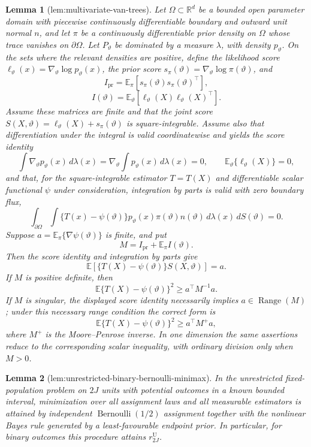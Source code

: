 \documentclass{article}
\newtheorem{lemma}{Lemma}
\begin{document}
\begin{lemma}[lem:multivariate-van-trees]\label{lem:multivariate-van-trees}
Let \(\Omega\subset\mathbb R^d\) be a bounded open parameter domain with piecewise continuously differentiable boundary and outward unit normal \(n\), and let \(\pi\) be a continuously differentiable prior density on \(\Omega\) whose trace vanishes on \(\partial\Omega\). Let \(P_\vartheta\) be dominated by a measure \(\lambda\), with density \(p_\vartheta\). On the sets where the relevant densities are positive, define the likelihood score \(\ell_\vartheta(x)=\nabla_\vartheta\log p_\vartheta(x)\), the prior score \(s_\pi(\vartheta)=\nabla_\vartheta\log\pi(\vartheta)\), and
\[
 I_{\mathrm{pr}}
 =\mathbb E_\pi\!\left[
 s_\pi(\vartheta)s_\pi(\vartheta)^{\!\top}
 \right],
\]
\[
 I(\vartheta)
 =\mathbb E_\vartheta\!\left[
 \ell_\vartheta(X)\ell_\vartheta(X)^{\!\top}
 \right].
\]
Assume these matrices are finite and that the joint score \(S(X,\vartheta)=\ell_\vartheta(X)+s_\pi(\vartheta)\) is square-integrable. Assume also that differentiation under the integral is valid coordinatewise and yields the score identity
\[
 \int \nabla_\vartheta p_\vartheta(x)\,d\lambda(x)
 =\nabla_\vartheta\int p_\vartheta(x)\,d\lambda(x)=0,
 \qquad
 \mathbb E_\vartheta\{\ell_\vartheta(X)\}=0,
\]
and that, for the square-integrable estimator \(T=T(X)\) and differentiable scalar functional \(\psi\) under consideration, integration by parts is valid with zero boundary flux,
\[
 \int_{\partial\Omega}\int
 \{T(x)-\psi(\vartheta)\}p_\vartheta(x)\pi(\vartheta)
 n(\vartheta)\,d\lambda(x)\,dS(\vartheta)=0.
\]
Suppose \(a=\mathbb E_\pi\{\nabla\psi(\vartheta)\}\) is finite, and put
\[
 M=I_{\mathrm{pr}}+\mathbb E_\pi I(\vartheta).
\]
Then the score identity and integration by parts give
\[
 \mathbb E\!\left[
 \{T(X)-\psi(\vartheta)\}S(X,\vartheta)
 \right]=a.
\]
If \(M\) is positive definite, then
\[
 \mathbb E\{T(X)-\psi(\vartheta)\}^{2}
 \ge a^{\!\top}M^{-1}a.
\]
If \(M\) is singular, the displayed score identity necessarily implies \(a\in\operatorname{Range}(M)\); under this necessary range condition the correct form is
\[
 \mathbb E\{T(X)-\psi(\vartheta)\}^{2}
 \ge a^{\!\top}M^{+}a,
\]
where \(M^{+}\) is the Moore--Penrose inverse. In one dimension the same assertions reduce to the corresponding scalar inequality, with ordinary division only when \(M>0\).
\end{lemma}

\begin{lemma}[lem:unrestricted-binary-bernoulli-minimax]\label{lem:unrestricted-binary-bernoulli-minimax}
In the unrestricted fixed-population problem on \(2J\) units with potential outcomes in a known bounded interval, minimization over all assignment laws and all measurable estimators is attained by independent \(\operatorname{Bernoulli}(1/2)\) assignment together with the nonlinear Bayes rule generated by a least-favourable endpoint prior. In particular, for binary outcomes this procedure attains \(r^{\mathrm U}_{2J}\).
\end{lemma}
\end{document}
